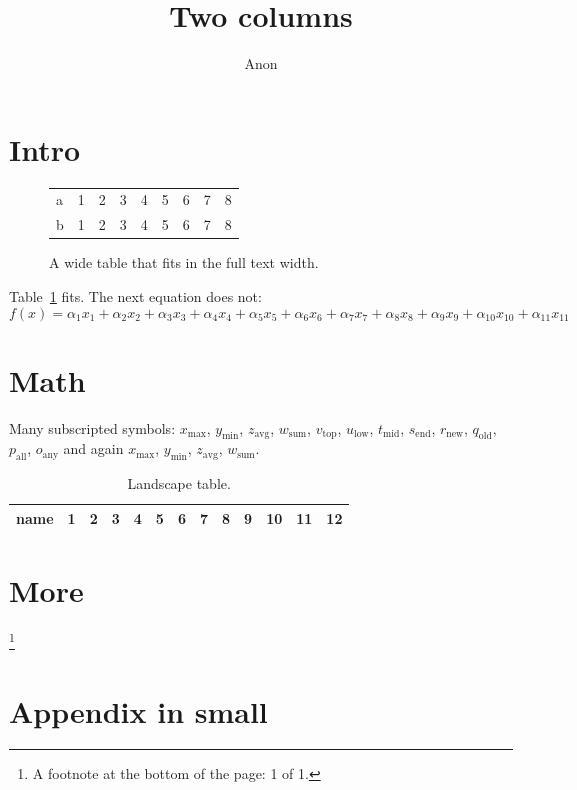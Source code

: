 \documentclass[twocolumn]{article}
\begin{document}
\title{Two columns}\author{Anon}\maketitle
\section{Intro}\lipsum[1-3]
\begin{figure}[t]\centering
\begin{tabular}{lrrrrrrrr}\toprule a&1&2&3&4&5&6&7&8\\ b&1&2&3&4&5&6&7&8\\\bottomrule\end{tabular}
\caption{A wide table that fits in the full text width.}\label{tab:wide}
\end{figure}
Table~\ref{tab:wide} fits. The next equation does not:
\begin{equation}
f(x) = \alpha_1 x_1 + \alpha_2 x_2 + \alpha_3 x_3 + \alpha_4 x_4 + \alpha_5 x_5 + \alpha_6 x_6 + \alpha_7 x_7 + \alpha_8 x_8 + \alpha_9 x_9 + \alpha_{10} x_{10} + \alpha_{11} x_{11}
\end{equation}
\lipsum[4-6]
\section{Math}
Many subscripted symbols: $x_{\mathrm{max}}$, $y_{\mathrm{min}}$, $z_{\mathrm{avg}}$, $w_{\mathrm{sum}}$, $v_{\mathrm{top}}$, $u_{\mathrm{low}}$, $t_{\mathrm{mid}}$, $s_{\mathrm{end}}$, $r_{\mathrm{new}}$, $q_{\mathrm{old}}$, $p_{\mathrm{all}}$, $o_{\mathrm{any}}$ and again $x_{\mathrm{max}}$, $y_{\mathrm{min}}$, $z_{\mathrm{avg}}$, $w_{\mathrm{sum}}$.
\lipsum[11-12]
\begin{landscape}
\begin{table}\centering\begin{tabular}{lrrrrrrrrrrrr}\toprule name&1&2&3&4&5&6&7&8&9&10&11&12\\\bottomrule\end{tabular}\caption{Landscape table.}\end{table}
\lipsum[13]
\end{landscape}
\section{More}\lipsum[14-16]\footnote{A footnote at the bottom of the page: 1 of 1.}
\appendix
\section{Appendix in small}
{\small \lipsum[17-24]}
\end{document}
